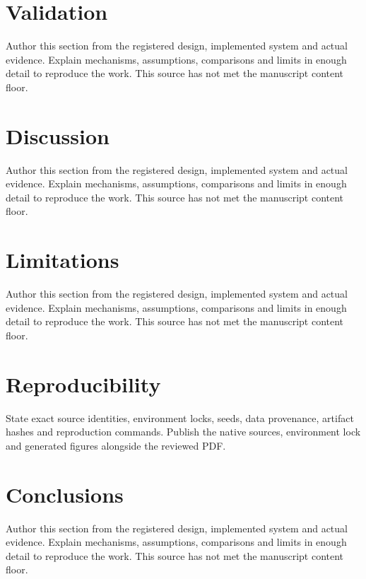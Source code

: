\documentclass[11pt]{article}
\begin{document}
\section{Validation}\label{sec:validation}
Author this section from the registered design, implemented system and actual evidence. Explain mechanisms, assumptions, comparisons and limits in enough detail to reproduce the work. This source has not met the manuscript content floor.

\section{Discussion}\label{sec:discussion}
Author this section from the registered design, implemented system and actual evidence. Explain mechanisms, assumptions, comparisons and limits in enough detail to reproduce the work. This source has not met the manuscript content floor.

\section{Limitations}\label{sec:limitations}
Author this section from the registered design, implemented system and actual evidence. Explain mechanisms, assumptions, comparisons and limits in enough detail to reproduce the work. This source has not met the manuscript content floor.

\section{Reproducibility}\label{sec:reproducibility}
State exact source identities, environment locks, seeds, data provenance, artifact hashes and reproduction commands. Publish the native sources, environment lock and generated figures alongside the reviewed PDF.

\section{Conclusions}\label{sec:conclusions}
Author this section from the registered design, implemented system and actual evidence. Explain mechanisms, assumptions, comparisons and limits in enough detail to reproduce the work. This source has not met the manuscript content floor.

% 
% 
\end{document}
